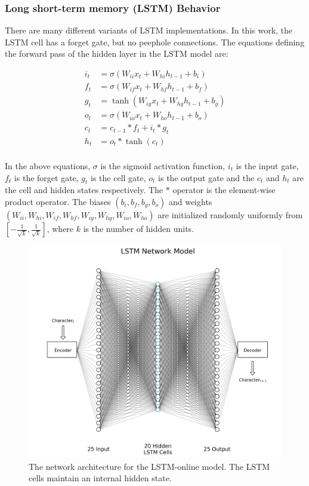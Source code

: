 \documentclass{article}
\begin{document}
\subsubsection*{Long short-term memory (LSTM) Behavior}
There are many different variants of LSTM implementations. In this work, the LSTM cell has a forget gate, but no peephole connections. The equations defining the forward pass of the hidden layer in the LSTM model are:

\begin{align*}
    i_t &= \sigma\left(W_{ii}x_t + W_{hi}h_{t-1} + b_i\right)\\
    f_t &= \sigma\left(W_{if}x_t + W_{hf}h_{t-1} + b_f\right)\\
    g_t &= \tanh\left(W_{ig}x_t + W_{hg}h_{t-1} + b_g\right)\\
    o_t &= \sigma\left(W_{io}x_t + W_{ho}h_{t-1} + b_o\right)\\
    c_t &= c_{t-1}\ast f_t + i_t \ast g_t\\
    h_t &= o_t \ast \tanh\left(c_t\right)\\
\end{align*}

In the above equations, $\sigma$ is the sigmoid activation function, $i_t$ is the input gate, $f_t$ is the forget gate, $g_t$ is the cell gate, $o_t$ is the output gate and the $c_t$ and $h_t$ are the cell and hidden states respectively. The $\ast$ operator is the element-wise product operator. The biases $\left(b_i, b_f, b_g, b_o\right)$ and weights $\left(W_{ii}, W_{hi}, W_{if}, W_{hf}, W_{ig}, W_{hg},W_{io}, W_{ho}\right)$ are initialized randomly uniformly from $\left[-\frac{1}{\sqrt{k}}, \frac{1}{\sqrt{k}}\right]$, where $k$ is the number of hidden units. \cite{jozefowicz2015empirical} 

\begin{figure}[H]
    \centering
    \includegraphics[width=0.9\linewidth]{../diagrams/lstm.png}
    \caption{The network architecture for the LSTM-online model. The LSTM cells maintain an internal hidden state.}
    \label{fig:lstm-online-model}
\end{figure}
\end{document}
